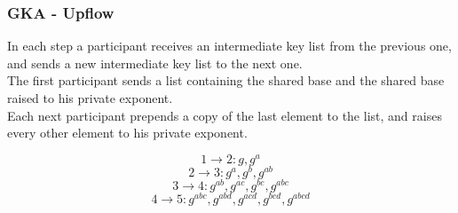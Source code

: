 \begin{frame}
  \frametitle{GKA - Upflow}
  In each step a participant receives an intermediate key list from the previous one, and sends a new intermediate key list to the next one.\\[0.3cm]

  The first participant sends a list containing the shared base and the shared base raised to his private exponent.\\[0.3cm]

  Each next participant prepends a copy of the last element to the list, and raises every other element to his private exponent.\\[0.3cm]

  \begin{minipage}{.47\textwidth}
    \[ 1 \rightarrow 2: g, g^a \]
    \[ 2 \rightarrow 3: g^a, g^b, g^{ab} \]
    \[ 3 \rightarrow 4: g^{ab}, g^{ac}, g^{bc}, g^{abc} \]
    \[ 4 \rightarrow 5: g^{abc}, g^{abd}, g^{acd}, g^{bcd}, g^{abcd} \]
  \end{minipage}
  \begin{minipage}{.47\textwidth}
   \begin{figure}
    \end{figure}
  \end{minipage}
\end{frame}

